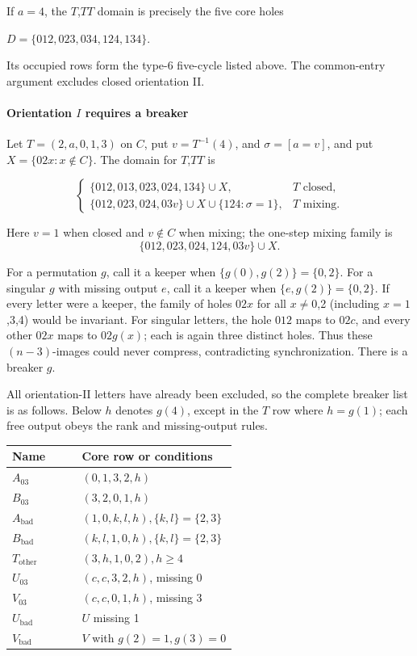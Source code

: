 \documentclass[11pt]{article}
\theoremstyle{definition}
\theoremstyle{plain}
\begin{document}
If \(a=4\), the \(T\),\(TT\) domain is precisely the five core holes

\(D=\{012,023,034,124,134\}.\)

Its occupied rows form the type-6 five-cycle listed above. The
common-entry argument excludes closed orientation II.

\paragraph{Orientation \(I\) requires a
breaker}\label{orientation-i-requires-a-breaker}

Let \(T=(2,a,0,1,3)\) on \(C\), put \(v=T^{-1}(4)\), and
\(\sigma=[a=v]\), and put \(X=\{02x:x\notin C\}\). The domain for \(T\),\(TT\) is

\[
\begin{cases}\{012,013,023,024,134\}\cup X,&T\text{ closed},\\\{012,023,024,03v\}\cup X\cup\{124:\sigma=1\},&T\text{ mixing}.\end{cases}
\]

Here \(v=1\) when closed and \(v\notin C\) when mixing; the one-step
mixing family is
\[\{012,023,024,124,03v\}\cup X.\]

For a permutation \(g\), call it a keeper when
\(\{g(0),g(2)\}=\{0,2\}\). For a singular \(g\) with missing output \(e\),
call it a keeper when \(\{e,g(2)\}=\{0,2\}\). If every letter were
a keeper, the family of holes \(02x\) for all \(x\ne 0\),2
(including \(x=1\),3,4) would be invariant. For singular letters, the
hole \(012\) maps to \(02c\), and every other \(02x\) maps to \(02g(x)\); each is
again three distinct holes. Thus these \((n-3)\)-images could never
compress, contradicting synchronization. There is a breaker \(g\).

All orientation-II letters have already been excluded, so the complete
breaker list is as follows. Below \(h\) denotes \(g(4)\), except in the \(T\)
row where \(h=g(1)\); each free output obeys the rank and missing-output
rules.

\begin{center}
\begin{tabular}{lp{0.69\linewidth}}
\toprule
Name  &  Core row or conditions \\
\midrule

\(A_{03}\) & \((0,1,3,2,h)\)\\
\(B_{03}\) & \((3,2,0,1,h)\)\\
\(A_{\mathrm{bad}}\) & \((1,0,k,l,h), \{k,l\}=\{2,3\}\)\\
\(B_{\mathrm{bad}}\) & \((k,l,1,0,h), \{k,l\}=\{2,3\}\)\\
\(T_{\mathrm{other}}\) & \((3,h,1,0,2), h\ge 4\)\\
\(U_{03}\) & \((c,c,3,2,h)\), missing 0\\
\(V_{03}\) & \((c,c,0,1,h)\), missing 3\\
\(U_{\mathrm{bad}}\) & \(U\) missing 1\\
\(V_{\mathrm{bad}}\) & \(V\) with \(g(2)=1,g(3)=0\)\\
\bottomrule
\end{tabular}
\end{center}
\end{document}
